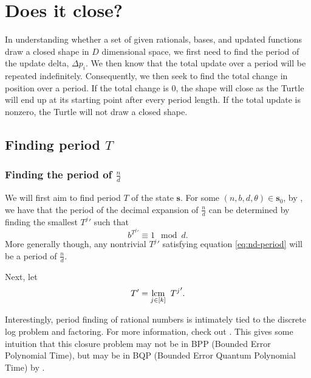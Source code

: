 \documentclass[11pt,titlepage]{article}
\newcommand{\rationalPeriod}{{T^j}'}
\newcommand{\rationalPeriodTotal}{{T}'}
\begin{document}



\section{Does it close?}
In understanding whether a set of given rationals, bases, and updated functions 
draw a closed shape in $D$ dimensional space, we first need to find the period of 
the update delta, $\Delta p_i$. We then know that the total update over a period will be repeated 
indefinitely. Consequently, we then seek to find the total change in position over a period. 
If the total change is $0$, the shape will close as the Turtle will end up at its starting point
after every period length. If the total update is nonzero, the Turtle will not draw a closed
shape.

\subsection{Finding period $T$}
\subsubsection{Finding the period of $\frac{n}{d}$}
We will first aim to find period $T$ of the state $\pmb{s}$.
For some $(n, b, d, \theta) \in \pmb{s}_0$, by \cite{MathOverflowFracPeriod},
we have that the period of the decimal expansion of $\frac{n}{d}$
can be determined by finding the smallest $\rationalPeriod$ such that
\begin{equation}
\label{eq:nd-period}
b ^ {\rationalPeriod} \equiv 1 \mod d.
\end{equation}
More generally though, any nontrivial $\rationalPeriod$ satisfying equation \ref{eq:nd-period}
will be a period of $\frac{n}{d}$.

Next, let $$
\rationalPeriodTotal = \lcm{j \in [k]}\; \rationalPeriod.
$$

\begin{remark}[Complexity]
\label{remark:periodcomplex}
  Interestingly, period finding of rational numbers is intimately tied to the discrete
  log problem and factoring. For more information, check out \cite{MathOverflowFracPeriod}.
  This gives some intuition that this closure problem may not be in BPP (Bounded Error Polynomial Time),
  but may be in BQP (Bounded Error Quantum Polynomial Time) by \cite{Shor_1997}.
\end{remark}
\end{document}
